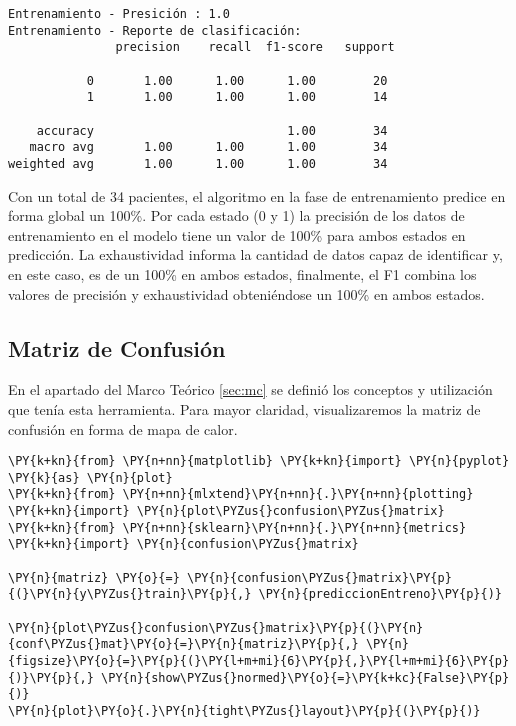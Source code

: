     \begin{Verbatim}[commandchars=\\\{\}]
Entrenamiento - Presición : 1.0
Entrenamiento - Reporte de clasificación:
               precision    recall  f1-score   support

           0       1.00      1.00      1.00        20
           1       1.00      1.00      1.00        14

    accuracy                           1.00        34
   macro avg       1.00      1.00      1.00        34
weighted avg       1.00      1.00      1.00        34

    \end{Verbatim}

    Con un total de 34 pacientes, el algoritmo en la fase de entrenamiento predice en forma global un 100\%. Por cada estado (0 y 1) la precisión de los datos de entrenamiento en el modelo tiene un valor de 100\% para ambos estados en predicción. La exhaustividad informa la cantidad de datos capaz de identificar y, en este caso, es de un 100\% en ambos estados, finalmente, el F1 combina los valores de precisión y exhaustividad obteniéndose un 100\% en ambos estados.

    \hypertarget{matriz-de-confusiuxf3n}{%
\subsection{Matriz de Confusión}\label{matriz-de-confusiuxf3n}}

	En el apartado del Marco Teórico \ref{sec:mc} se definió los conceptos y utilización que tenía esta herramienta. Para mayor claridad, visualizaremos la matriz de confusión en forma de mapa de calor.

    \begin{tcolorbox}[breakable, size=fbox, boxrule=1pt, pad at break*=1mm,colback=cellbackground, colframe=cellborder]
\begin{Verbatim}[commandchars=\\\{\}]
\PY{k+kn}{from} \PY{n+nn}{matplotlib} \PY{k+kn}{import} \PY{n}{pyplot} \PY{k}{as} \PY{n}{plot}
\PY{k+kn}{from} \PY{n+nn}{mlxtend}\PY{n+nn}{.}\PY{n+nn}{plotting} \PY{k+kn}{import} \PY{n}{plot\PYZus{}confusion\PYZus{}matrix}
\PY{k+kn}{from} \PY{n+nn}{sklearn}\PY{n+nn}{.}\PY{n+nn}{metrics} \PY{k+kn}{import} \PY{n}{confusion\PYZus{}matrix}

\PY{n}{matriz} \PY{o}{=} \PY{n}{confusion\PYZus{}matrix}\PY{p}{(}\PY{n}{y\PYZus{}train}\PY{p}{,} \PY{n}{prediccionEntreno}\PY{p}{)}

\PY{n}{plot\PYZus{}confusion\PYZus{}matrix}\PY{p}{(}\PY{n}{conf\PYZus{}mat}\PY{o}{=}\PY{n}{matriz}\PY{p}{,} \PY{n}{figsize}\PY{o}{=}\PY{p}{(}\PY{l+m+mi}{6}\PY{p}{,}\PY{l+m+mi}{6}\PY{p}{)}\PY{p}{,} \PY{n}{show\PYZus{}normed}\PY{o}{=}\PY{k+kc}{False}\PY{p}{)}
\PY{n}{plot}\PY{o}{.}\PY{n}{tight\PYZus{}layout}\PY{p}{(}\PY{p}{)}
\end{Verbatim}
\end{tcolorbox}

